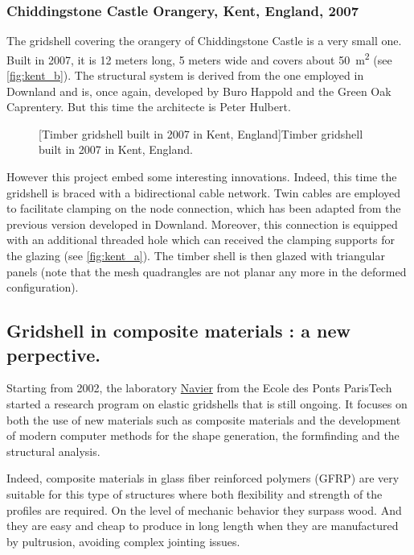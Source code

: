 \subsubsection{Chiddingstone Castle Orangery, Kent, England, 2007}

The gridshell covering the orangery of Chiddingstone Castle is a very small one. Built in 2007, it is 12 meters long, 5 meters wide and covers about \SI{50}{m^2} (see \cref{fig:kent_b}). The structural system is derived from the one employed in Downland and is, once again, developed by Buro Happold and the Green Oak Caprentery. But this time the architecte is Peter Hulbert.
 \begin{figure}[ht]
		\hspace*{\fill}
		\vspace{10pt}
		[Timber gridshell built in 2007 in Kent, England]{Timber gridshell built in 2007 in Kent, England.}
		\label{fig:kent} 
\end{figure}

However this project embed some interesting innovations. Indeed, this time the gridshell is braced with a bidirectional cable network. Twin cables are employed to facilitate clamping on the node connection, which has been adapted from the previous version developed in Downland. Moreover, this connection is equipped with an additional threaded hole which can received the clamping supports for the glazing (see \cref{fig:kent_a}). The timber shell is then glazed with triangular panels (note that the mesh quadrangles are not planar any more in the deformed configuration).

\subsection{Gridshell in composite materials : a new perpective.}
Starting from 2002, the laboratory \href{http://navier.enpc.fr}{Navier} from the Ecole des Ponts ParisTech started a research program on elastic gridshells that is still ongoing. It focuses on both the use of new materials such as composite materials and the development of modern computer methods for the shape generation, the formfinding and the structural analysis.

Indeed, composite materials in glass fiber reinforced polymers (GFRP) are very suitable for this type of structures where both flexibility and strength of the profiles are required. On the level of mechanic behavior they surpass wood. And they are easy and cheap to produce in long length when they are manufactured by pultrusion, avoiding complex jointing issues.

